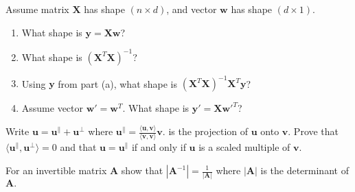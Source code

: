 \documentclass{harvardml}
\theoremstyle{definition}
\theoremstyle{plain}
\renewcommand{\v}[1]{\mathbf{#1}}
\begin{document}
\begin{problem}

Assume matrix $\mathbf{X}$ has shape $(n \times d)$, and vector $\mathbf{w}$ has shape $(d \times 1)$.

\begin{enumerate}[label=(\alph*)]
		        
		        \item What shape is $\mathbf{y} =  \mathbf{X} \mathbf{w}$?
		        
		        \item What shape is $(\mathbf{X}^T \mathbf{X})^{-1}$?
		        
		        \item Using $\mathbf{y}$ from part (a), what shape is $(\mathbf{X}^T \mathbf{X})^{-1} \mathbf{X}^T \mathbf{y}$?
		        
		        \item Assume vector $\mathbf{w}' = \mathbf{w}^T$.  What shape is $\mathbf{y}' = \mathbf{X}\mathbf{w}'^T $?  

		    \end{enumerate}

\end{problem}

\begin{problem}
        Write $\mathbf{u} = \mathbf{u}^\parallel + \mathbf{u^\perp}$ where $\mathbf{u}^\parallel = \frac{\langle \v u, \v v \rangle}
				{\langle \v v, \v v \rangle} \v v$. is the projection of $\v u$ onto $\v v$. Prove that $\langle \mathbf{u}^\parallel,
		\mathbf{u^\perp} \rangle = 0$ and that $\v u = \mathbf{u}^\parallel$ if and only if $\v u$ is a scaled multiple of $\v v$.
        \end{problem}


\begin{problem}
                For an invertible matrix $\mathbf{A}$ show that $|\mathbf{A}^{-1}| = \frac{1}{|\mathbf A|}$ where $|\mathbf A|$ is the determinant of $\mathbf{A}.$
                
                
\end{problem}
        
        
        
\end{document}
